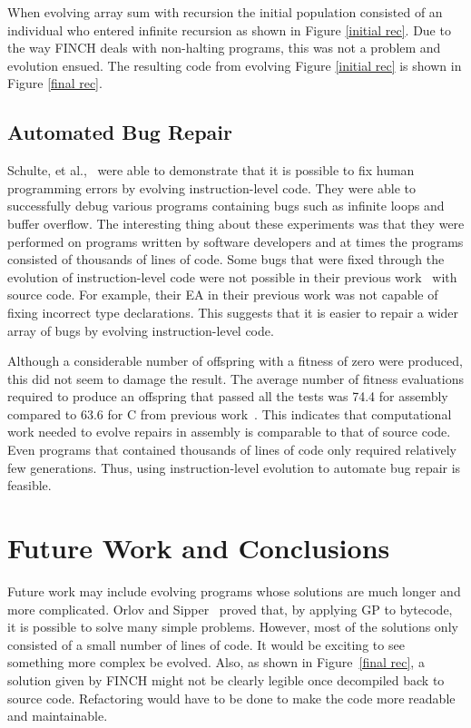 \documentclass{sig-alternate}
\begin{document}
When evolving array sum with recursion the initial population consisted of an individual who entered infinite recursion as shown in Figure \ref{initial rec}. Due to the way FINCH deals with non-halting programs, this was not a problem and evolution ensued. The resulting code from evolving Figure \ref{initial rec} is shown in Figure \ref{final rec}.


\subsection{Automated Bug Repair}

Schulte, et al.,~\cite{Assembly:2010} were able to demonstrate that it is possible to fix human programming errors by evolving instruction-level code. They were able to successfully debug various programs containing bugs such as infinite loops and buffer overflow. The interesting thing about these experiments was that they were performed on programs written by software developers and at times the programs consisted of thousands of lines of code. Some bugs that were fixed through the evolution of instruction-level code were not possible in their previous work~\cite{Forrest:2009} with source code. For example, their EA in their previous work was not capable of fixing incorrect type declarations. This suggests that it is easier to repair a wider array of bugs by evolving instruction-level code.

Although a considerable number of offspring with a fitness of zero were produced, this did not seem to damage the result. The average number of fitness evaluations required to produce an offspring that passed all the tests was 74.4 for assembly compared to 63.6 for C from previous work~\cite{Forrest:2009}. This indicates that computational work needed to evolve repairs in assembly is comparable to that of source code. Even programs that contained thousands of lines of code only required relatively few generations. Thus, using instruction-level evolution to automate bug repair is feasible.
 

\section{Future Work and Conclusions}

Future work may include evolving programs whose solutions are much longer and more complicated. Orlov and Sipper~\cite{FINCH:2011} proved that, by applying GP to bytecode, it is possible to solve many simple problems. However, most of the solutions only consisted of a small number of lines of code. It would be exciting to see something more complex be evolved. Also, as shown in Figure~\ref{final rec}, a solution given by FINCH might not be clearly legible once decompiled back to source code. Refactoring would have to be done to make the code more readable and maintainable.
\end{document}
